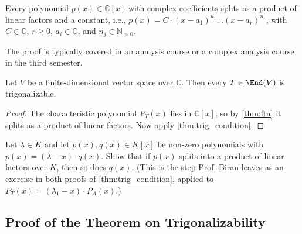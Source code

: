 \begin{theorem} \label{thm:fta}
  Every polynomial $p(x) \in \mathbb{C}[x]$ with complex coefficients splits as a product of linear factors and a constant, i.e.,
  $p(x) = C \cdot (x-a_1)^{n_1} \dots (x-a_r)^{n_r}$, with $C \in \mathbb{C}$, $r \ge 0$, $a_i \in \mathbb{C}$, and $n_j \in \mathbb{N}_{>0}$.
\end{theorem}

\begin{remark}\label{rem:fta_proof}
  The proof is typically covered in an analysis course or a complex analysis course in the third semester.
\end{remark}

\begin{corollary}\label{cor:complex_trigonalizable}
  Let $V$ be a finite-di\-men\-sional vector space over $\mathbb{C}$. Then every $T \in \End(V)$ is trigonalizable.
\end{corollary}

\begin{proof}
  The characteristic polynomial $P_T(x)$ lies in $\mathbb{C}[x]$, so by \cref{thm:fta} it splits as a product of linear factors. Now apply \cref{thm:trig_condition}.
\end{proof}

\begin{exercise}\label{ex:factor_splits}
  Let $\lambda \in K$ and let $p(x), q(x) \in K[x]$ be non-zero polynomials with $p(x) = (\lambda - x) \cdot q(x)$. Show that if $p(x)$ splits into a product of linear factors over $K$, then so does $q(x)$.
  (This is the step Prof. Biran leaves as an exercise in both proofs of \cref{thm:trig_condition}, applied to $P_T(x) = (\lambda_1 - x) \cdot P_A(x)$.)
\end{exercise}

\subsection{Proof of the Theorem on Trigonalizability}


